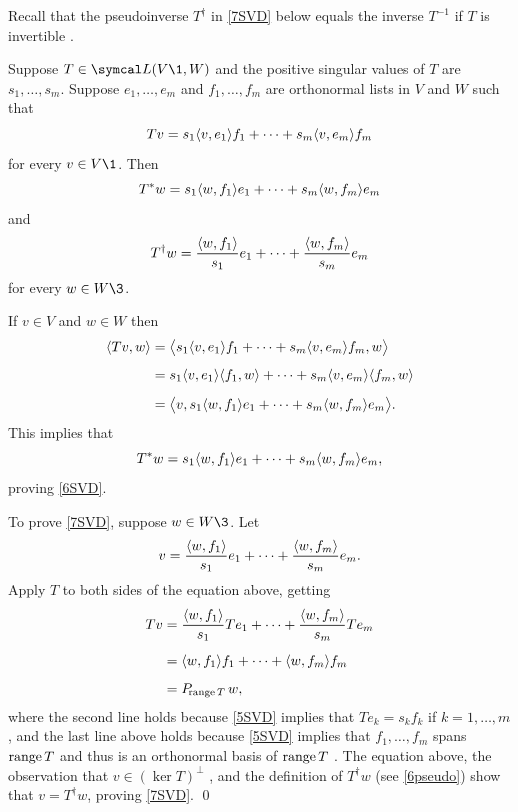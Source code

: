 \pagebreak[3]

Recall that the pseudoinverse $T^\dagger$ in \ref{7SVD} below equals the inverse $T^{-1}$ if $T$ is invertible
.

{%
Suppose $T \in \L(V\1, W)$ and the positive singular values of $T$ are $s_1, \dots, s_m$.  Suppose
$e_1, \dots, e_m$ and $f_1, \dots, f_m$ are orthonormal lists in $V$ and $W$ such that
\begin{equation} \label{5SVD}
Tv = s_1 \ip{v, e_1} f_1 + \dots + s_m \ip{v, e_m} f_m
\end{equation}%
for every $v \in V\1$. Then
\begin{equation} \label{6SVD}
T^*w = s_1 \ip{w, f_1} e_1 + \dots + s_m \ip{w, f_m} e_m
\end{equation}%
and
\begin{equation} \label{7SVD}
T^\dagger w = \frac{\ip{w, f_1}}{s_1} e_1 + \dots + \frac{\ip{w, f_m}}{s_m} e_m
\end{equation}%
for every $w \in W\3$.
}

\proof
If $v \in V$ and $w \in W$ then
\begin{align*}
\ip{Tv,w} &= \ip[\big]{s_1 \ip{v, e_1} f_1 + \dots + s_m \ip{v, e_m} f_m, w} \\[5bp]
&= s_1 \ip{v, e_1} \ip{f_1,w} + \dots + s_m \ip{v, e_m} \ip{f_m, w} \\[5bp]
&= \ip[\big]{v, s_1 \ip{w, f_1} e_1 + \dots + s_m \ip{w, f_m} e_m}.
\end{align*}
This implies that
\[
T^*w = s_1 \ip{w, f_1} e_1 + \dots + s_m \ip{w, f_m} e_m,
\]
proving \ref{6SVD}.

To prove \ref{7SVD}, suppose $w \in W\3$. Let
\[
v = \frac{\ip{w, f_1}}{s_1} e_1 + \dots + \frac{\ip{w, f_m}}{s_m} e_m.
\]
Apply $T$ to both sides of the equation above, getting
\begin{align*}
Tv &= \frac{\ip{w, f_1}}{s_1} Te_1 + \dots + \frac{\ip{w, f_m}}{s_m} Te_m \\[5bp]
&= \ip{w, f_1} f_1 + \dots + \ip{w, f_m} f_m \\[5bp]
&= P_{\!\ran T} \, w,
\end{align*}
where the second line holds because \ref{5SVD} implies that $Te_k = s_k f_k$ if $k = 1, \ldots, m$, and the last line above holds because \ref{5SVD} implies that $f_1, \ldots, f_m$ spans $\ran T$ and thus is an orthonormal basis of $\ran T$ . The equation above, the observation that $v \in (\ker T)^\perp$ , and the definition of $T^\dagger w$ (see \ref{6pseudo}) show that $v = T^\dagger w$, proving \ref{7SVD}.
\qed


